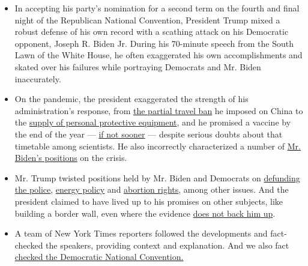 \begin{itemize}
\item
  In accepting his party's nomination for a second term on the fourth
  and final night of the Republican National Convention, President Trump
  mixed a robust defense of his own record with a scathing attack on his
  Democratic opponent, Joseph R. Biden Jr. During his 70-minute speech
  from the South Lawn of the White House, he often exaggerated his own
  accomplishments and skated over his failures while portraying
  Democrats and Mr. Biden inaccurately.
\item
  On the pandemic, the president exaggerated the strength of his
  administration's response, from
  \href{https://www.nytimes3xbfgragh.onion/live/2020/08/27/us/rnc-fact-check\#when-i-took-bold-action-to-issue-a-travel-ban-on-china-very-early-indeed-joe-biden-called-it-hysterical-and-xenophobic}{the
  partial travel ban} he imposed on China to the
  \href{https://www.nytimes3xbfgragh.onion/live/2020/08/27/us/rnc-fact-check\#we-shipped-hundreds-of-millions-of-masks-gloves-and-gowns-to-our-front-line-health-care-workers}{supply
  of personal protective equipment}, and he promised a vaccine by the
  end of the year ---
  \href{https://www.nytimes3xbfgragh.onion/live/2020/08/27/us/rnc-fact-check\#we-are-delivering-lifesaving-therapies-and-will-produce-a-vaccine-before-the-end-of-the-year-or-maybe-even-sooner}{if
  not sooner} --- despite serious doubts about that timetable among
  scientists. He also incorrectly characterized a number of
  \href{https://www.nytimes3xbfgragh.onion/live/2020/08/27/us/rnc-fact-check\#instead-of-following-the-science-joe-biden-wants-to-inflict-a-painful-shutdown-on-the-entire-country}{Mr.
  Biden's positions} on the crisis.
\item
  Mr. Trump twisted positions held by Mr. Biden and Democrats on
  \href{https://www.nytimes3xbfgragh.onion/live/2020/08/27/us/rnc-fact-check\#make-no-mistake-if-you-give-power-to-joe-biden-the-radical-left-will-defund-police-departments-all-across-america}{defunding
  the police},
  \href{https://www.nytimes3xbfgragh.onion/live/2020/08/27/us/rnc-fact-check\#biden-has-promised-to-abolish-the-production-of-american-oil-coal-shale-and-natural-gas-these-same-policies-led-to-crippling-pow}{energy
  policy} and
  \href{https://www.nytimes3xbfgragh.onion/live/2020/08/27/us/rnc-fact-check\#joe-biden-claims-he-has-empathy-for-the-vulnerable-yet-the-party-he-leads-supports-the-extreme-late-term-abortion-of-defenseless}{abortion
  rights}, among other issues. And the president claimed to have lived
  up to his promises on other subjects, like building a border wall,
  even where the evidence
  \href{https://www.nytimes3xbfgragh.onion/live/2020/08/27/us/rnc-fact-check\#we-have-already-built-300-miles-of-border-wall-and-we-are-adding-10-new-miles-every-single-week-the-wall-will-soon-be-complete-a}{does
  not back him up}.
\item
  A team of New York Times reporters followed the developments and
  fact-checked the speakers, providing context and explanation. And we
  also fact
  \href{https://www.nytimes3xbfgragh.onion/2020/08/21/us/politics/fact-check-democrats.html}{checked
  the Democratic National Convention.}
\end{itemize}

